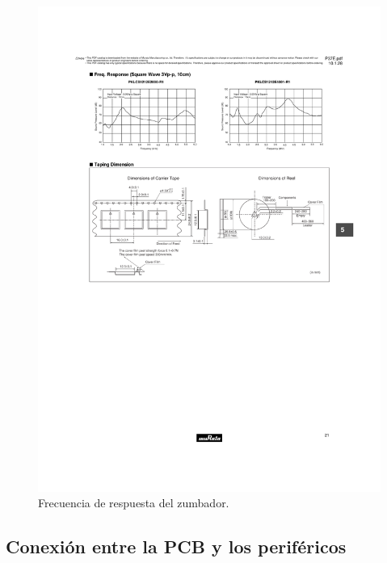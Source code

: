 \begin{figure}[H]
	\noindent \begin{centering}
		\includegraphics[width=\linewidth/2]{capitulo3/buzzer_freq}
		\par\end{centering}
	\smallskip
	\caption{\label{fig:buzzer_freq} Frecuencia de respuesta del zumbador.}
\end{figure} 

\smallskip

\subsection{Conexión entre la PCB y los periféricos}

\smallskip

